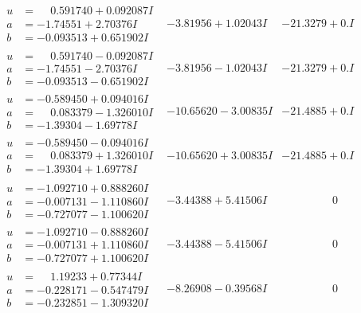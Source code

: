 \documentclass[1p]{elsarticle_modified}
\theoremstyle{definition}
\begin{document}
$$\begin{array}{c|c|c}
\begin{aligned}
u &= \phantom{-}0.591740 + 0.092087 I \\
a &= -1.74551 + 2.70376 I \\
b &= -0.093513 + 0.651902 I\end{aligned}
 & -3.81956 + 1.02043 I & -21.3279 + 0. I\phantom{ +0.000000I} \\ \hline\begin{aligned}
u &= \phantom{-}0.591740 - 0.092087 I \\
a &= -1.74551 - 2.70376 I \\
b &= -0.093513 - 0.651902 I\end{aligned}
 & -3.81956 - 1.02043 I & -21.3279 + 0. I\phantom{ +0.000000I} \\ \hline\begin{aligned}
u &= -0.589450 + 0.094016 I \\
a &= \phantom{-}0.083379 - 1.326010 I \\
b &= -1.39304 - 1.69778 I\end{aligned}
 & -10.65620 - 3.00835 I & -21.4885 + 0. I\phantom{ +0.000000I} \\ \hline\begin{aligned}
u &= -0.589450 - 0.094016 I \\
a &= \phantom{-}0.083379 + 1.326010 I \\
b &= -1.39304 + 1.69778 I\end{aligned}
 & -10.65620 + 3.00835 I & -21.4885 + 0. I\phantom{ +0.000000I} \\ \hline\begin{aligned}
u &= -1.092710 + 0.888260 I \\
a &= -0.007131 - 1.110860 I \\
b &= -0.727077 - 1.100620 I\end{aligned}
 & -3.44388 + 5.41506 I & \phantom{-0.000000 } 0 \\ \hline\begin{aligned}
u &= -1.092710 - 0.888260 I \\
a &= -0.007131 + 1.110860 I \\
b &= -0.727077 + 1.100620 I\end{aligned}
 & -3.44388 - 5.41506 I & \phantom{-0.000000 } 0 \\ \hline\begin{aligned}
u &= \phantom{-}1.19233 + 0.77344 I \\
a &= -0.228171 - 0.547479 I \\
b &= -0.232851 - 1.309320 I\end{aligned}
 & -8.26908 - 0.39568 I & \phantom{-0.000000 } 0 \\ \hline\begin{aligned}

\end{aligned}
\end{array}$$
\end{document}
